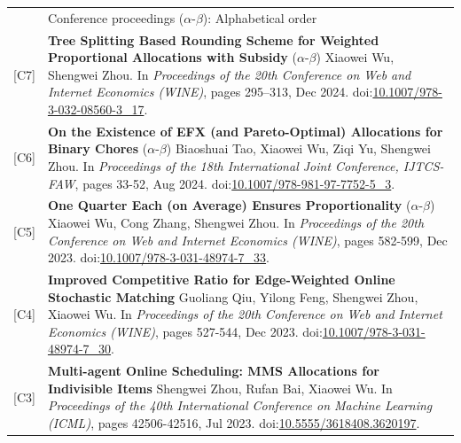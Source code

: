 \documentclass[letterpaper, 11pt]{article}
\newcommand{\headingfont}{\Large\color{OliveGreen}}
\newenvironment{SectionTable}[1]{
	\renewcommand*{\arraystretch}{1.2}
	\setlength{\tabcolsep}{10pt}
	\begin{longtable}{Rp{5.2in}} & #1 \\}
{\end{longtable}\vspace{-1cm}}
\begin{document}
\begin{SectionTable}{\headingfont Conference proceedings \; \small\color{black}  ($\alpha$-$\beta$): Alphabetical order}
\hypertarget{OR-WINE24}{[C7]} & 
\textbf{Tree Splitting Based Rounding Scheme for Weighted Proportional Allocations with Subsidy} \newline
($\alpha$-$\beta$) Xiaowei Wu, Shengwei Zhou.  \newline
In \textit{Proceedings of the 20th Conference on Web and Internet Economics (WINE)}, pages 295--313, Dec 2024. doi:\href{https://link.springer.com/chapter/10.1007/978-3-032-08560-3_17}{10.1007/978-3-032-08560-3\_17}. \\

\vspace{-0.48cm}\hypertarget{EFX-IJTCS24}{[C6]} & 
\textbf{On the Existence of EFX (and Pareto-Optimal) Allocations for Binary Chores} \newline
($\alpha$-$\beta$) Biaoshuai Tao, Xiaowei Wu, Ziqi Yu, Shengwei Zhou.  \newline
In \textit{Proceedings of the 18th International Joint Conference, IJTCS-FAW}, pages 33-52, Aug 2024. doi:\href{https://link.springer.com/chapter/10.1007/978-981-97-7752-5_3}{10.1007/978-981-97-7752-5\_3}.\\

\hypertarget{OR-WINE23}{[C5]} & 
\textbf{One Quarter Each (on Average) Ensures Proportionality} \newline
($\alpha$-$\beta$) Xiaowei Wu, Cong Zhang, Shengwei Zhou.  \newline
In \textit{Proceedings of the 20th Conference on Web and Internet Economics (WINE)}, pages 582-599, Dec 2023. doi:\href{https://link.springer.com/chapter/10.1007/978-3-031-48974-7_33}{10.1007/978-3-031-48974-7\_33}.\\

[C4] & 
\textbf{Improved Competitive Ratio for Edge-Weighted Online Stochastic Matching} \newline
Guoliang Qiu, Yilong Feng, Shengwei Zhou, Xiaowei Wu.  \newline
In \textit{Proceedings of the 20th Conference on Web and Internet Economics (WINE)}, pages 527-544, Dec 2023. doi:\href{https://link.springer.com/chapter/10.1007/978-3-031-48974-7_30}{10.1007/978-3-031-48974-7\_30}.\\

[C3] & 
\textbf{Multi-agent Online Scheduling: MMS Allocations for Indivisible Items } \newline
Shengwei Zhou, Rufan Bai, Xiaowei Wu.  \newline
In \textit{Proceedings of the 40th International Conference on Machine Learning (ICML)}, pages 42506-42516, Jul 2023. doi:\href{https://dl.acm.org/doi/10.5555/3618408.3620197}{10.5555/3618408.3620197}.\\


\end{SectionTable}
\end{document}
